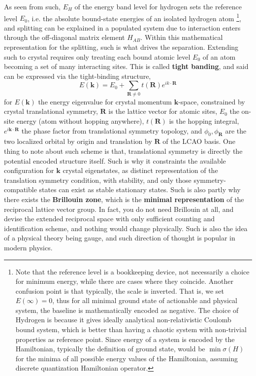\documentclass[%
 reprint,
 amsmath,amssymb,
 aps,
]{revtex4-2}
\begin{document}
As seen from such, $E_{H}$ of the energy band level for hydrogen sets the reference level $E_{0}$, i.e. the absolute bound-state energies of an isolated hydrogen atom \footnote{Note that the reference level is a bookkeeping device, not necessarily a choice for minimum energy, while there are cases where they coincide. Another confusion point is that typically, the scale is inverted. That is, we set $E(\infty)=0$, thus for all minimal ground state of actionable and physical system, the baseline is mathematically encoded as negative. The choice of Hydrogen is because it gives ideally analytical non-relativistic Coulomb bound system, which is better than having a chaotic system with non-trivial properties as reference point. Since energy of a system is encoded by the Hamiltonian, typically the definition of ground state, would be $\min{\sigma(H)}$ for the minima of all possible energy values of the Hamiltonian, assuming discrete quantization Hamiltonian operator.}, and splitting can be explained in a populated system due to interaction enters through the off-diagonal matrix element $H_{AB}$. Within this mathematical representation for the splitting, such is what drives the separation. Extending such to crystal requires only treating each bound atomic level $E_{0}$ of an atom becoming a set of many interacting sites. This is called \textbf{tight banding}, and said can be expressed via the tight-binding structure, 
\begin{equation}
    E(\mathbf{k}) = E_{0} + \sum_{\mathbf{R}\neq 0} t(\mathbf{R})e^{ik\cdot \mathbf{R}}
\end{equation}
for $E(\mathbf{k})$ the energy eigenvalue for crystal momentum $\mathbf{k}$-space, constrained by crystal translational symmetry, $\mathbf{R}$ is the lattice vector for atomic sites, $E_{0}$ the on-site energy (atom without hopping anywhere), $t(\mathbf{R})$ is the hopping integral, $e^{i\mathbf{k}\cdot \mathbf{R}}$ the phase factor from translational symmetry topology, and $\phi_{0},\phi_{\mathbf{R}}$ are the two localized orbital by origin and translation by $\mathbf{R}$ of the LCAO basis. One thing to note about such scheme is that, translational symmetry is directly the potential encoded structure itself. Such is why it constraints the available configuration for $\mathbf{k}$ crystal eigenstates, as distinct representation of the translation symmetry condition, with stability, and only those symmetry-compatible states can exist as stable stationary states. Such is also partly why there exists the \textbf{Brillouin zone}, which is the \textbf{minimal representation} of the reciprocal lattice vector group. In fact, you do not need Brillouin at all, and devise the extended reciprocal space with only sufficient counting and identification scheme, and nothing would change physically. Such is also the idea of a physical theory being gauge, and such direction of thought is popular in modern physics. 
\end{document}
